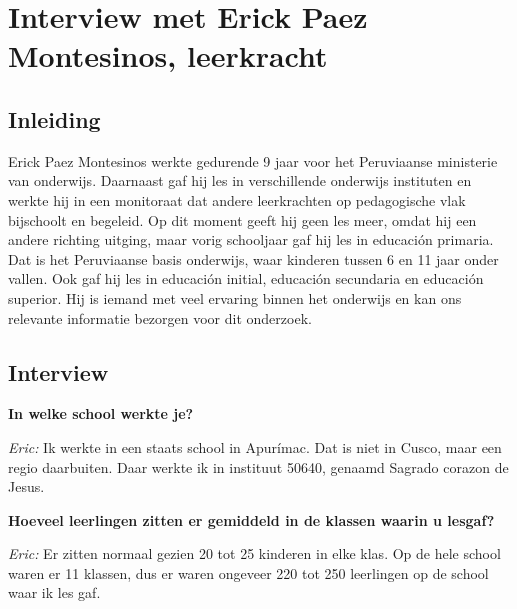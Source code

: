 
\chapter{Interview met Erick Paez Montesinos, leerkracht}
\label{ch:interviewMetEric}

\section{Inleiding}
Erick Paez Montesinos werkte gedurende 9 jaar voor het Peruviaanse ministerie van onderwijs. Daarnaast gaf hij les in verschillende onderwijs instituten en werkte hij in een monitoraat dat andere leerkrachten op pedagogische vlak bijschoolt en begeleid. Op dit moment geeft hij geen les meer, omdat hij een andere richting uitging, maar vorig schooljaar gaf hij les in educación primaria. Dat is het Peruviaanse basis onderwijs, waar kinderen tussen 6 en 11 jaar onder vallen. \autocite{Nuffic2015} Ook gaf hij les in educación initial, educación secundaria en educación superior. Hij is iemand met veel ervaring binnen het onderwijs en kan ons relevante informatie bezorgen voor dit onderzoek.


\section{Interview}

\textbf{In welke school werkte je?}

\textit{Eric:} Ik werkte in een staats school in Apurímac. Dat is niet in Cusco, maar een regio daarbuiten. Daar werkte ik in instituut 50640, genaamd Sagrado corazon de Jesus.

\textbf{Hoeveel leerlingen zitten er gemiddeld in de klassen waarin u lesgaf?}

\textit{Eric:} Er zitten normaal gezien 20 tot 25 kinderen in elke klas. Op de hele school waren er 11 klassen, dus er waren ongeveer 220 tot 250 leerlingen op de school waar ik les gaf. %

